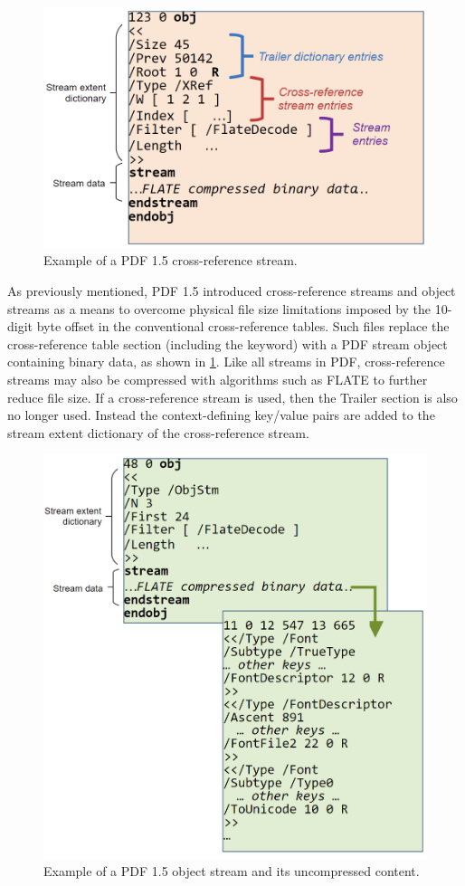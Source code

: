 \begin{figure}[t]
    \centering
    \includegraphics[width=0.65\linewidth]{figures/xrefstm.png}
    \caption{Example of a PDF 1.5 cross-reference stream.}
    \label{fig:XRefStm}
\end{figure}

As previously mentioned, PDF 1.5 introduced cross-reference streams and object streams as a means
to overcome physical file size limitations imposed by the 10-digit byte offset in the conventional
cross-reference tables.
Such files replace the cross-reference table section (including the  keyword) 
with a PDF stream object containing binary data, as shown in \cref{fig:XRefStm}. 
Like all streams in PDF, cross-reference streams may also be compressed with algorithms such as FLATE 
to further reduce file size. If a cross-reference stream is used, then the Trailer section is also no
longer used. Instead the context-defining key/value pairs are added to the stream extent dictionary of the cross-reference stream.

\begin{figure}[t]
    \centering
    \includegraphics[width=0.65\linewidth]{figures/ObjStm.png}
    \caption{Example of a PDF 1.5 object stream and its uncompressed content.}
    \label{fig:ObjStm}
\end{figure}

